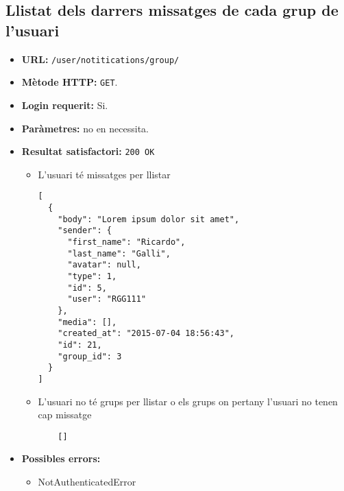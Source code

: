 \subsection{Llistat dels darrers missatges de cada grup de l'usuari}
\begin{itemize}
\item \textbf{\ac{URL}:} \texttt{/user/notitications/group/}
\item \textbf{Mètode \ac{HTTP}: } \texttt{GET}.
\item \textbf{Login requerit:} Si.
\item \textbf{Paràmetres:} no en necessita.

\item \textbf{Resultat satisfactori:} \texttt{200 OK}
	\begin{itemize}
		\item L'usuari té missatges per llistar
	\begin{verbatim}
[
  {
    "body": "Lorem ipsum dolor sit amet",
    "sender": {
      "first_name": "Ricardo",
      "last_name": "Galli",
      "avatar": null,
      "type": 1,
      "id": 5,
      "user": "RGG111"
    },
    "media": [],
    "created_at": "2015-07-04 18:56:43",
    "id": 21,
    "group_id": 3
  }
]
	\end{verbatim}
	
	\item L'usuari no té grups per llistar o els grups on pertany l'usuari no tenen cap missatge
	
	\begin{verbatim}
	[]
	\end{verbatim}
	\end{itemize}


\item \textbf{Possibles errors:}
	\begin{itemize}
		\item NotAuthenticatedError
	\end{itemize}
\end{itemize}
